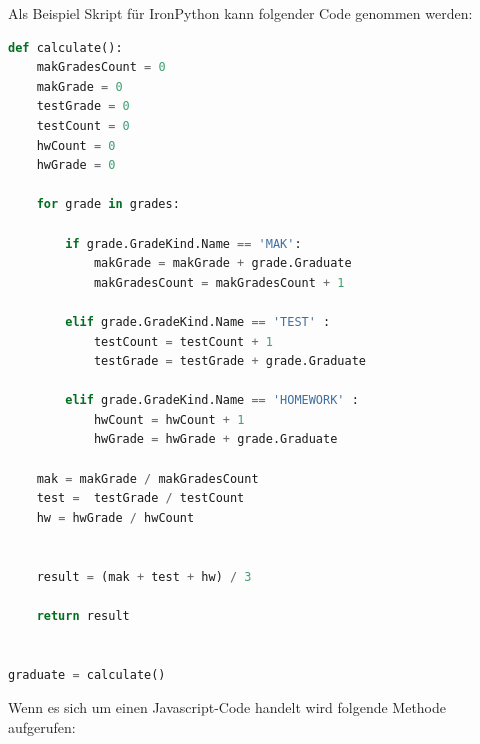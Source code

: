 \newpage
Als Beispiel Skript für IronPython kann folgender Code genommen werden:
\begin{lstlisting}[language={Python},caption=IronPython-Code,label=lst:impl:ipy]
def calculate():
    makGradesCount = 0
    makGrade = 0
    testGrade = 0
    testCount = 0
    hwCount = 0
    hwGrade = 0
    
    for grade in grades:

        if grade.GradeKind.Name == 'MAK':
            makGrade = makGrade + grade.Graduate
            makGradesCount = makGradesCount + 1
        
        elif grade.GradeKind.Name == 'TEST' :
            testCount = testCount + 1
            testGrade = testGrade + grade.Graduate
        
        elif grade.GradeKind.Name == 'HOMEWORK' :
            hwCount = hwCount + 1
            hwGrade = hwGrade + grade.Graduate

    mak = makGrade / makGradesCount
    test =  testGrade / testCount
    hw = hwGrade / hwCount


    result = (mak + test + hw) / 3 

    return result


graduate = calculate()

\end{lstlisting}


\newpage
{}

Wenn es sich um einen Javascript-Code handelt wird folgende Methode aufgerufen:

